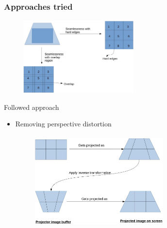 \documentclass{beamer}
\begin{document}
\begin{frame}
\frametitle{Approaches tried}

\begin{figure}
\includegraphics[width=6cm, height=4cm]{figures/hard_overlap.jpg}
\end{figure}
\end{frame}



\begin{frame}{Followed approach}
\begin{itemize}
\item Removing perspective distortion
\begin{figure}
\includegraphics[width=7cm, height=5cm]{figures/distort_sol.jpg}
\end{figure}
\end{itemize}
\end{frame}

\end{document}
